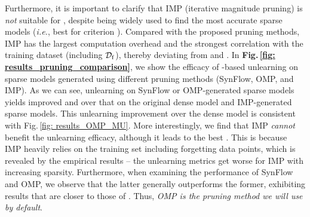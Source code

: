 
Furthermore, it is important to clarify that IMP (iterative magnitude pruning) is \textit{not} suitable for {\MU}, despite being widely used to find the most accurate sparse models (\textit{i.e.}, best for criterion ).
 Compared with the proposed pruning methods, IMP has the largest computation overhead   and the strongest correlation with the training dataset (including $\mathcal D_\mathrm{f}$), thereby deviating from  and .
 In \textbf{Fig.\,\ref{fig: results_pruning_comparison}}, we show  the   efficacy  of {\FT}-based unlearning on sparse models generated  using  different pruning methods (SynFlow, OMP, and IMP). 
 As we can see, unlearning on {SynFlow} or {OMP}-generated sparse models yields improved {\UA} and {\MIAF} over that on the original dense model and   {IMP}-generated sparse models.  This unlearning improvement over the dense model is consistent with Fig.\,\ref{fig: results_OMP_MU}. More interestingly, we find that {IMP} \textit{cannot} benefit the unlearning efficacy, although it leads to the best {\TA}. This is because {IMP} heavily relies on the training set including forgetting data points, which is revealed by the empirical results -- the unlearning metrics get worse for IMP with increasing sparsity.
 Furthermore, when examining the performance of SynFlow and OMP, we observe that the latter   generally outperforms the former, exhibiting results that are closer to those of {\retrain}. 
 Thus,  \textit{{OMP} is the pruning method we will use by default}. 
 
 
 
 



